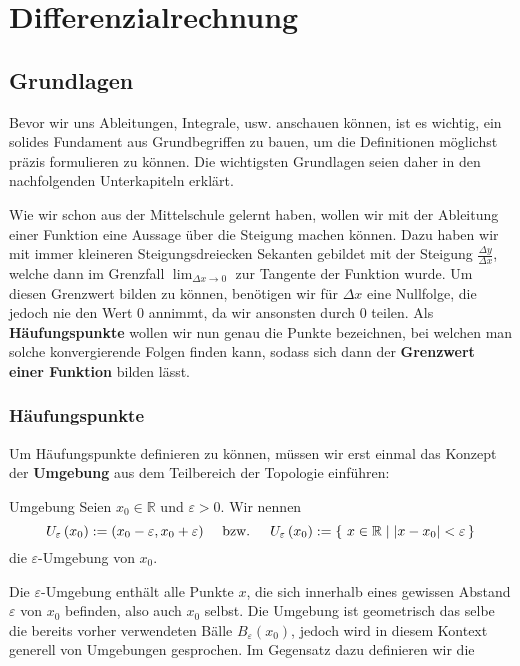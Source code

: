 \chapter{Differenzialrechnung}

\section{Grundlagen}\label{cha_grundlagen_diffrechnung}
Bevor wir uns Ableitungen, Integrale, usw. anschauen können, ist es wichtig, ein solides Fundament aus Grundbegriffen zu bauen, um die Definitionen möglichst präzis formulieren zu können. Die wichtigsten Grundlagen seien daher in den nachfolgenden Unterkapiteln erklärt.

Wie wir schon aus der Mittelschule gelernt haben, wollen wir mit der Ableitung einer Funktion eine Aussage über die Steigung machen können. Dazu haben wir mit immer kleineren Steigungsdreiecken Sekanten gebildet mit der Steigung $\frac{\Delta y}{\Delta x}$, welche dann im Grenzfall $\lim_{\Delta x \to 0}$ zur Tangente der Funktion wurde. Um diesen Grenzwert bilden zu können, benötigen wir für $\Delta x$ eine Nullfolge, die jedoch nie den Wert $0$ annimmt, da wir ansonsten durch $0$ teilen. Als \textbf{Häufungspunkte} wollen wir nun genau die Punkte bezeichnen, bei welchen man solche konvergierende Folgen finden kann, sodass sich dann der \textbf{Grenzwert einer Funktion} bilden lässt.

\subsection{Häufungspunkte}\label{cha_limit_points}
Um Häufungspunkte definieren zu können, müssen wir erst einmal das Konzept der \textbf{Umgebung} aus dem  Teilbereich der Topologie einführen:

\begin{definition}{Umgebung}{}
    Seien $x_0 \in \mathbb{R}$ und $ \varepsilon > 0$. Wir nennen 
    $$U_\varepsilon\,(x_0) := (x_0 - \varepsilon , x_0 + \varepsilon)\quad \text{ bzw. } \quad U_\varepsilon\,(x_0) := \{\ x \in \mathbb{R} \mid \left|x-x_0\right| < \varepsilon \,\}$$
     die $\varepsilon$-Umgebung von $x_0$.
\end{definition}
    
 Die $\varepsilon$-Umgebung enthält alle Punkte $x$, die sich innerhalb eines gewissen Abstand  $\varepsilon$ von $x_0$ befinden, also auch $x_0$ selbst. Die Umgebung ist geometrisch das selbe die  bereits vorher verwendeten Bälle $B_\varepsilon(x_0)$, jedoch wird in diesem Kontext generell von Umgebungen gesprochen. Im Gegensatz dazu definieren wir die 
 
